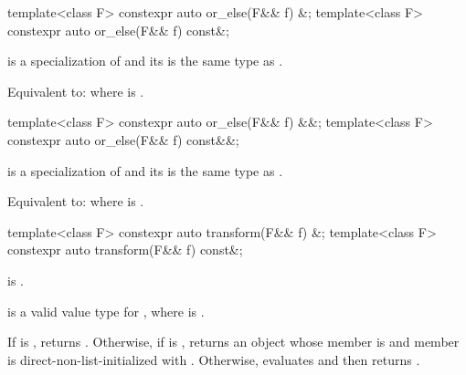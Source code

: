 %
\begin{itemdecl}
template<class F>
  constexpr auto or_else(F&& f) &;
template<class F>
  constexpr auto or_else(F&& f) const&;
\end{itemdecl}

\begin{itemdescr}
\pnum
\mandates
{} is a specialization of  and its  is the same type as .

\pnum
\effects
Equivalent to:  where  is .
\end{itemdescr}

%
\begin{itemdecl}
template<class F>
  constexpr auto or_else(F&& f) &&;
template<class F>
  constexpr auto or_else(F&& f) const&&;
\end{itemdecl}

\begin{itemdescr}
\pnum
\mandates
{} is a specialization of  and its  is the same type as .

\pnum
\effects
Equivalent to:  where  is .
\end{itemdescr}

%
\begin{itemdecl}
template<class F>
  constexpr auto transform(F&& f) &;
template<class F>
  constexpr auto transform(F&& f) const&;
\end{itemdecl}

\begin{itemdescr}
\pnum
\constraints
{} is .

\pnum
\mandates
{} is a valid value type for , where  is .

\pnum
\effects
If  is , returns . Otherwise, if  is , returns an  object whose  member is  and  member is direct-non-list-initialized with . Otherwise, evaluates  and then returns .
\end{itemdescr}

